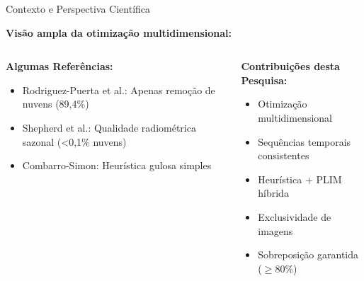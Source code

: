 \documentclass[aspectratio=169,11pt]{beamer}
\begin{document}
\begin{frame}{Contexto e Perspectiva Científica}
\vspace{-0.2cm}
\begin{center}
\textbf{Visão ampla da otimização multidimensional:}
\end{center}

\begin{columns}[T]
    \begin{column}{0.48\textwidth}
        \textbf{\color{ufal}Algumas Referências:}
        \begin{itemize}
            \item Rodriguez-Puerta et al\@.: Apenas remoção de nuvens (89,4\%)
            \item Shepherd et al\@.: Qualidade radiométrica sazonal (<0,1\% nuvens)
            \item Combarro-Simon: Heurística gulosa simples
        \end{itemize}
    \end{column}
    \begin{column}{0.48\textwidth}
        \textbf{\color{success}Contribuições desta Pesquisa:}
        \begin{itemize}
            \item Otimização multidimensional
            \item Sequências temporais consistentes
            \item Heurística + PLIM híbrida
            \item Exclusividade de imagens
            \item Sobreposição garantida ($\geq$80\%)
        \end{itemize}
    \end{column}
\end{columns}
\end{frame}
\end{document}
